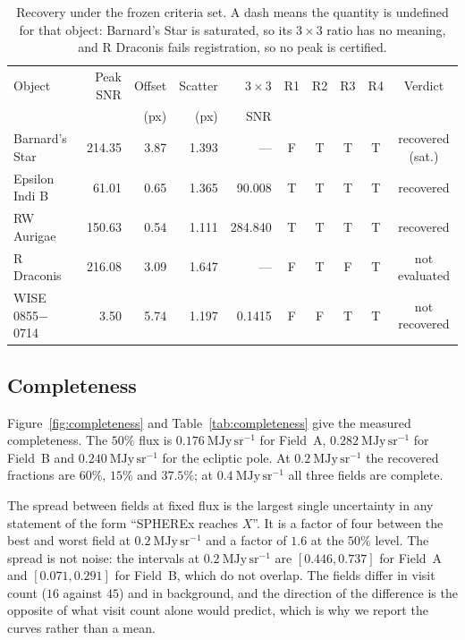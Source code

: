 \documentclass[11pt,a4paper]{article}
\newcommand{\mjysr}{\ \mathrm{MJy\,sr^{-1}}}
\begin{document}
\begin{table}[htbp]
\centering
\small
\caption{Recovery under the frozen criteria set. A dash means the quantity is
undefined for that object: Barnard's Star is saturated, so its $3\times3$ ratio has
no meaning, and R Draconis fails registration, so no peak is certified.}
\label{tab:recovery}
\begin{tabular}{lrrrrccccc}
\toprule
Object & Peak SNR & Offset & Scatter & $3\times3$ & R1 & R2 & R3 & R4 & Verdict \\
       &          & (px)   & (px)    & SNR        &    &    &    &    & \\
\midrule
Barnard's Star   & 214.35 & 3.87 & 1.393 & ---     & F & T & T & T & recovered (sat.) \\
Epsilon Indi B   & 61.01  & 0.65 & 1.365 & 90.008  & T & T & T & T & recovered \\
RW Aurigae       & 150.63 & 0.54 & 1.111 & 284.840 & T & T & T & T & recovered \\
R Draconis       & 216.08 & 3.09 & 1.647 & ---     & F & T & F & T & not evaluated \\
WISE 0855$-$0714 & 3.50   & 5.74 & 1.197 & 0.1415  & F & F & T & T & not recovered \\
\bottomrule
\end{tabular}
\end{table}

\subsection{Completeness}\label{sec:completeness}
Figure~\ref{fig:completeness} and Table~\ref{tab:completeness} give the measured
completeness. The $50\%$ flux is $0.176\mjysr$ for Field~A, $0.282\mjysr$ for
Field~B and $0.240\mjysr$ for the ecliptic pole. At $0.2\mjysr$ the recovered
fractions are $60\%$, $15\%$ and $37.5\%$; at $0.4\mjysr$ all three fields are
complete.

The spread between fields at fixed flux is the largest single uncertainty in any
statement of the form ``SPHEREx reaches $X$''. It is a factor of four between the
best and worst field at $0.2\mjysr$ and a factor of $1.6$ at the $50\%$ level. The
spread is not noise: the intervals at $0.2\mjysr$ are $[0.446,0.737]$ for Field~A
and $[0.071,0.291]$ for Field~B, which do not overlap. The fields differ in visit
count ($16$ against $45$) and in background, and the direction of the difference
is the opposite of what visit count alone would predict, which is why we report
the curves rather than a mean.
\end{document}
